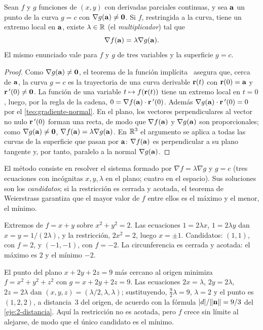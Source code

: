 \begin{teorema}\label{teo:lagrange}
Sean $f$ y $g$ funciones de $(x,y)$ con derivadas parciales continuas, y sea $\mathbf{a}$ un punto de la curva $g=c$ con $\nabla g(\mathbf{a})\neq\mathbf{0}$. Si $f$, restringida a la curva, tiene un extremo local en $\mathbf{a}$, existe $\lambda\in\mathbb{R}$ (el \emph{multiplicador}) tal que
\[
\nabla f(\mathbf{a})=\lambda\nabla g(\mathbf{a}).
\]
El mismo enunciado vale para $f$ y $g$ de tres variables y la superficie $g=c$.
\end{teorema}

\begin{proof}
Como $\nabla g(\mathbf{a})\neq\mathbf{0}$, el teorema de la función implícita~\cite[§9.6--9.7]{apostol2} asegura que, cerca de $\mathbf{a}$, la curva $g=c$ es la trayectoria de una curva derivable $\mathbf{r}(t)$ con $\mathbf{r}(0)=\mathbf{a}$ y $\mathbf{r}\,'(0)\neq\mathbf{0}$. La función de una variable $t\mapsto f(\mathbf{r}(t))$ tiene un extremo local en $t=0$, luego, por la regla de la cadena, $0=\nabla f(\mathbf{a})\cdot\mathbf{r}\,'(0)$. Además $\nabla g(\mathbf{a})\cdot\mathbf{r}\,'(0)=0$ por el \cref{teo:gradiente-normal}. En el plano, los vectores perpendiculares al vector no nulo $\mathbf{r}\,'(0)$ forman una recta, de modo que $\nabla f(\mathbf{a})$ y $\nabla g(\mathbf{a})$ son proporcionales; como $\nabla g(\mathbf{a})\neq\mathbf{0}$, $\nabla f(\mathbf{a})=\lambda\nabla g(\mathbf{a})$. En $\mathbb{R}^3$ el argumento se aplica a todas las curvas de la superficie que pasan por $\mathbf{a}$: $\nabla f(\mathbf{a})$ es perpendicular a su plano tangente y, por tanto, paralelo a la normal $\nabla g(\mathbf{a})$.
\end{proof}

El método consiste en resolver el sistema formado por $\nabla f=\lambda\nabla g$ y $g=c$ (tres ecuaciones con incógnitas $x,y,\lambda$ en el plano; cuatro en el espacio). Sus soluciones son los \emph{candidatos}; si la restricción es cerrada y acotada, el teorema de Weierstrass garantiza que el mayor valor de $f$ entre ellos es el máximo y el menor, el mínimo.

\begin{ejemplo}\label{ej:t5-lagrange-circulo}
Extremos de $f=x+y$ sobre $x^2+y^2=2$. Las ecuaciones $1=2\lambda x$, $1=2\lambda y$ dan $x=y=1/(2\lambda)$, y la restricción, $2x^2=2$, luego $x=\pm1$. Candidatos: $(1,1)$, con $f=2$, y $(-1,-1)$, con $f=-2$. La circunferencia es cerrada y acotada: el máximo es $2$ y el mínimo $-2$.
\end{ejemplo}

\begin{ejemplo}\label{ej:t5-lagrange-plano}
El punto del plano $x+2y+2z=9$ más cercano al origen minimiza $f=x^2+y^2+z^2$ con $g=x+2y+2z=9$. Las ecuaciones $2x=\lambda$, $2y=2\lambda$, $2z=2\lambda$ dan $(x,y,z)=(\lambda/2,\lambda,\lambda)$; sustituyendo, $\tfrac{9}{2}\lambda=9$, $\lambda=2$ y el punto es $(1,2,2)$, a distancia~$3$ del origen, de acuerdo con la fórmula $\lvert d\rvert/\lVert\mathbf{n}\rVert=9/3$ del \cref{eje:2-distancia}. Aquí la restricción no es acotada, pero $f$ crece sin límite al alejarse, de modo que el único candidato es el mínimo.
\end{ejemplo}

